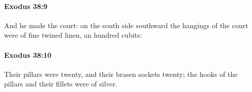 		\paragraph{Exodus 38:9} %
			\label{EXODUS-38-9}

			And he made the court: on the south side southward the hangings of the court were of fine twined linen, an hundred cubits:


		\paragraph{Exodus 38:10} %
			\label{EXODUS-38-10}

			Their pillars were twenty, and their brasen sockets twenty; the hooks of the pillars and their fillets were of silver.


